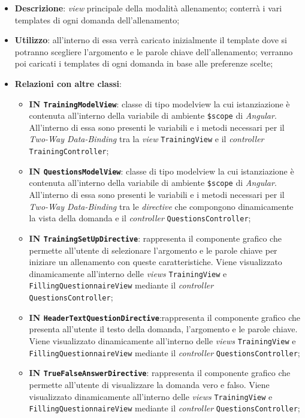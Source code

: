 \begin{itemize}
	\item \textbf{Descrizione}: \textit{view} principale della modalità allenamento; conterrà i vari templates di ogni domanda dell'allenamento;
	\item \textbf{Utilizzo}: all'interno di essa verrà caricato inizialmente il template dove si potranno scegliere l'argomento e le parole chiave dell'allenamento; verranno poi caricati i templates di ogni domanda in base alle preferenze scelte; 
	\item \textbf{Relazioni con altre classi}:
	\begin{itemize}
		\item \textbf{IN \texttt{TrainingModelView}}: classe di tipo modelview la cui istanziazione è contenuta all'interno della variabile di ambiente \texttt{\$scope} di \textit{Angular}. All'interno di essa sono presenti le variabili e i metodi necessari per il \textit{Two-Way Data-Binding} tra la \textit{view} \texttt{TrainingView} e il \textit{controller} \texttt{TrainingController};
		\item \textbf{IN \texttt{QuestionsModelView}}: classe di tipo modelview la cui istanziazione è contenuta all'interno della variabile di ambiente \texttt{\$scope} di \textit{Angular}. All'interno di essa sono presenti le variabili e i metodi necessari per il \textit{Two-Way Data-Binding} tra le \textit{directive} che compongono dinamicamente la vista della domanda e il \textit{controller} \texttt{QuestionsController};
		\item \textbf{IN \texttt{TrainingSetUpDirective}}: rappresenta il componente grafico che permette all'utente di selezionare l'argomento e le parole chiave per iniziare un allenamento con queste caratteristiche. Viene visualizzato	dinamicamente all'interno delle \textit{views} \texttt{TrainingView} e \texttt{FillingQuestionnaireView} mediante il \textit{controller} \\\texttt{QuestionsController};
		\item \textbf{IN \texttt{HeaderTextQuestionDirective}}:rappresenta il componente grafico che presenta all'utente il testo della domanda, l'argomento e le parole chiave. Viene visualizzato dinamicamente all'interno delle \textit{views} \texttt{TrainingView} e \texttt{FillingQuestionnaireView} mediante il \textit{controller} \texttt{QuestionsController};
		\item \textbf{IN \texttt{TrueFalseAnswerDirective}}: rappresenta il componente grafico che permette all'utente di visualizzare la domanda vero e falso. Viene visualizzato dinamicamente all'interno delle \textit{views} \texttt{TrainingView} e \texttt{FillingQuestionnaireView} mediante il \textit{controller} \texttt{QuestionsController};

\end{itemize}
\end{itemize}
